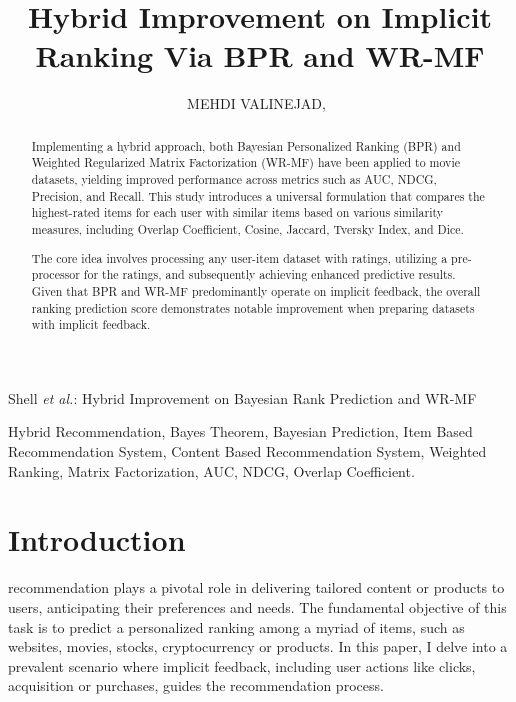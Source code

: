 \documentclass[journal]{IEEEtran}
\begin{document}

\title{Hybrid Improvement on Implicit Ranking Via BPR and WR-MF}

\author{MEHDI VALINEJAD,~}%

%
{Shell \MakeLowercase{\textit{et al.}}: Hybrid Improvement on Bayesian Rank Prediction and WR-MF}

\maketitle

\begin{abstract}
Implementing a hybrid approach, both Bayesian Personalized Ranking (BPR) and Weighted Regularized Matrix Factorization (WR-MF) have been applied to 
movie datasets, yielding improved performance across metrics such as AUC, NDCG, Precision, and Recall. This study introduces a 
universal formulation that compares the highest-rated items for each user with similar items based on various similarity measures, 
including Overlap Coefficient, Cosine, Jaccard, Tversky Index, and Dice.

The core idea involves processing any user-item dataset with ratings, utilizing a pre-processor for the ratings, and subsequently 
achieving enhanced predictive results. Given that BPR and WR-MF predominantly operate on implicit feedback, the overall ranking 
prediction score demonstrates notable improvement when preparing datasets with implicit feedback.
\end{abstract}

\begin{IEEEkeywords}
Hybrid Recommendation, Bayes Theorem, Bayesian Prediction, Item Based Recommendation System, Content Based Recommendation System, Weighted Ranking, Matrix Factorization, AUC, NDCG, Overlap Coefficient.
\end{IEEEkeywords}

\IEEEpeerreviewmaketitle

\section{Introduction}

 recommendation plays a pivotal role in delivering tailored content or products to users, anticipating their preferences and needs. 
The fundamental objective of this task is to predict a personalized ranking among a myriad of items, such as websites, movies, stocks, cryptocurrency or products. 
In this paper, I delve into a prevalent scenario where implicit feedback, including user actions like clicks, acquisition or purchases, guides the 
recommendation process.
\end{document}
